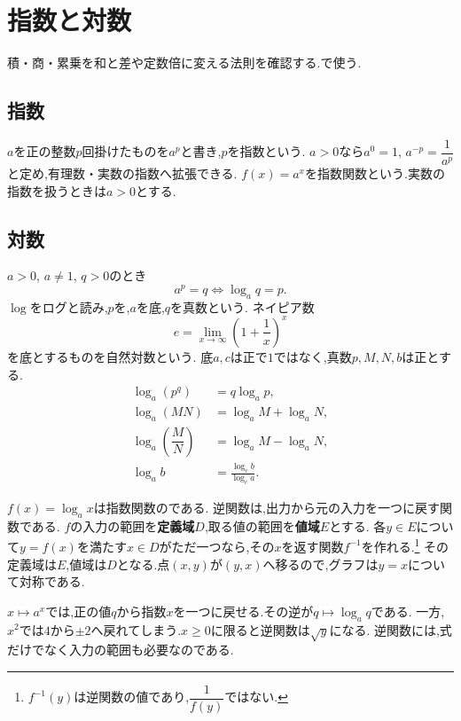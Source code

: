 
\section{指数と対数}\label{節：指数対数}
  積・商・累乗を和と差や定数倍に変える法則を確認する.で使う.

  \subsection{指数}\label{節：指数}
    $a$を正の整数$p$回掛けたものを$a^p$と書き,$p$を指数という.
    $a>0$なら$a^0=1$, $a^{-p}=\dfrac{1}{a^p}$と定め,有理数・実数の指数へ拡張できる.
    $f(x)=a^x$を指数関数という.実数の指数を扱うときは$a>0$とする.

  \subsection{対数}\label{節：対数}
    $a>0$, $a\ne1$, $q>0$のとき
    \[
      a^p=q\iff\log_a q=p.
    \]
    $\log$をログと読み,$p$を,$a$を底,$q$を真数という.
    ネイピア数
    \[
      e=\lim_{x\to\infty}\left(1+\frac1x\right)^x
    \]
    を底とするものを自然対数という.
    底$a,c$は正で$1$ではなく,真数$p,M,N,b$は正とする.
    \begin{align*}
      \log_a(p^q)&=q\log_a p,\\
      \log_a(MN)&=\log_a M+\log_a N,\\
      \log_a\left(\dfrac{M}{N}\right)&=\log_a M-\log_a N,\\
      \log_a b&=\frac{\log_c b}{\log_c a}.
    \end{align*}

    $f(x)=\log_a x$は指数関数のである.
    逆関数は,出力から元の入力を一つに戻す関数である.
    $f$の入力の範囲を\textbf{定義域}$D$,取る値の範囲を\textbf{値域}$E$とする.
    各$y\in E$について$y=f(x)$を満たす$x\in D$がただ一つなら,その$x$を返す関数$f^{-1}$を作れる.\footnote{$f^{-1}(y)$は逆関数の値であり,$\dfrac{1}{f(y)}$ではない.}
    その定義域は$E$,値域は$D$となる.点$(x,y)$が$(y,x)$へ移るので,グラフは$y=x$について対称である.

    $x\mapsto a^x$では,正の値$q$から指数$x$を一つに戻せる.その逆が$q\mapsto\log_a q$である.
    一方,$x^2$では$4$から$\pm2$へ戻れてしまう.$x\ge0$に限ると逆関数は$\sqrt y$になる.
    逆関数には,式だけでなく入力の範囲も必要なのである.
